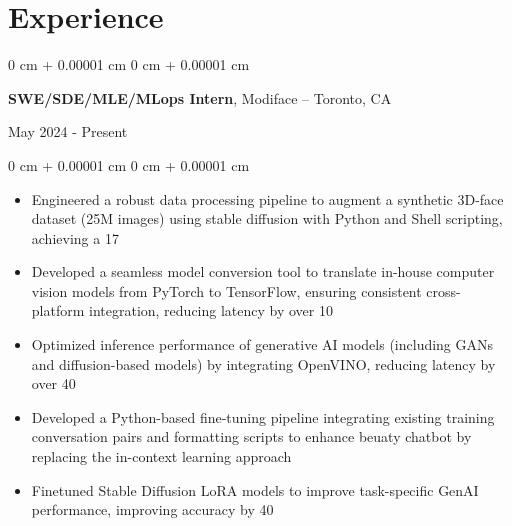 \documentclass[11pt, letterpaper]{article}
\newenvironment{highlights}{
    \begin{itemize}[
        topsep=0.08 cm,
        parsep=0.08 cm,
        partopsep=0pt,
        itemsep=0pt,
        leftmargin=0.2 cm + 17pt
    ]
}
{
    \end{itemize}
}
\newenvironment{onecolentry}{
    \begin{adjustwidth}{
        0 cm + 0.00001 cm
    }{
        0 cm + 0.00001 cm
    }
}{
    \end{adjustwidth}
}
\newenvironment{twocolentry}[2][]{
    \onecolentry
    \def\secondColumn{#2}
    \setcolumnwidth{\fill, 4.5 cm}
    \begin{paracol}{2}
}{
    \switchcolumn \raggedleft \secondColumn
    \end{paracol}
    \endonecolentry
}
\begin{document}
\section{Experience}
\vspace{0.08 cm}
\begin{twocolentry}{May 2024 - Present}
    {\textbf{SWE/SDE/MLE/MLops Intern}}, Modiface -- Toronto, CA
\end{twocolentry}
\vspace{0.05 cm}
\begin{onecolentry}
    \begin{highlights}
        \item Engineered a robust data processing pipeline to augment a synthetic 3D-face dataset (25M images) using stable diffusion with Python and Shell scripting, achieving a 17%
        \item Developed a seamless model conversion tool to translate in-house computer vision models from PyTorch to TensorFlow, ensuring consistent cross-platform integration, reducing latency by over 10%
        \item Optimized inference performance of generative AI models (including GANs and diffusion-based models) by integrating OpenVINO, reducing latency by over 40%
        \item Developed a Python-based fine-tuning pipeline integrating existing training conversation pairs and formatting scripts to enhance beuaty chatbot by replacing the in-context learning approach
        \item Finetuned Stable Diffusion LoRA models to improve task-specific GenAI performance, improving accuracy by 40%
    \end{highlights}
\end{onecolentry}
\vspace{0.35 cm}
\end{document}
